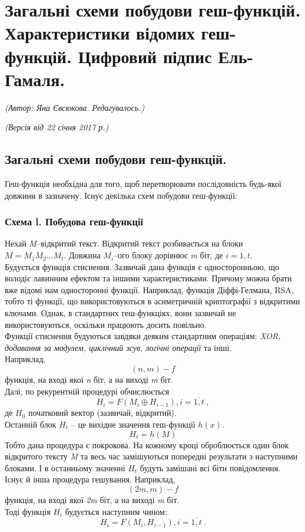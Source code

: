 \section{Загальні схеми побудови геш-функцій. Характеристики відомих геш-функцій. Цифровий підпис Ель-Гамаля.}
\begin{flushright}
\emph{(Автор: Яна Євсюкова. Редагувалось.)}
\par \emph{(Версія від 22 січня 2017 р.)}
\end{flushright}

\subsection{Загальні схеми побудови геш-функцій.}
Геш-функція необхідна для того, щоб перетворювати послідовність будь-якої довжини в зазначену. Існує декілька схем побудови геш-функції:
\subsubsection*{Схема l. Побудова геш-функції}
Нехай \textit{M}--відкритий текст. Відкритий текст розбивається на блоки \textit{$M=M_1M_2\ldots M_t$}. Довжина \textit{$M_i$}--ого блоку дорівнює \textit{m} біт, де \textit{$i=\overline{1,t}$}.\\
Будується функція стиснення. Зазвичай дана функція є односторонньою, що володіє лавинним ефектом та іншими характеристиками. Причому можна брати вже відомі нам односторонні функції. Наприклад, функція Діффі-Гелмана, RSA, тобто ті функції, що використовуються в асиметричній криптографії з відкритими ключами. Однак, в стандартних геш-функціях, вони зазвичай не використовуються, оскільки працюють досить повільно.\\
Функції стиснення будуються завдяки деяким стандартним операціям: \textit{XOR, додавання за модулем, циклічний зсув, логічні операції} та інші.\\
Наприклад,\\ \textit{$$(n,m)-f$$} функція, на вході якої \textit{n} біт, а на виході \textit{m} біт.\\
Далі, по рекурентній процедурі обчислюється $$H_i=F(M_i \oplus H_{i-1}), \textit{$i=\overline{1,t} \: ,$}$$
де \textit{$H_0$} початковий вектор (зазвичай, відкритий).\\
Останній блок \textit{$H_t$} -- це вихідне значення геш-функції \textit{$h(x)$}.$$H_t=h(M)$$
Тобто дана процедура є покрокова. На кожному кроці оброблюється один блок відкритого тексту \textit{M} та весь час замішуються попередні результати з наступними блоками. І в останньому значенні \textit{$H_t$} будуть замішані всі біти повідомлення.\\
Існує й інша процедура гешування. Наприклад, 
\textit{$$(2m,m)-f$$}функція, на вході якої \textit{2m} біт, а на виході \textit{m} біт.\\
Тоді функція \textit{$H_i$} будується наступним чином:
$$H_i=F(M_i , H_{i-1}), \textit{$i=\overline{1,t} \:.$}$$

